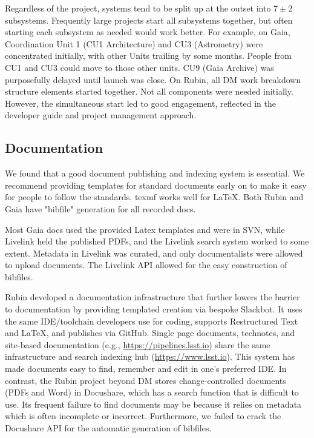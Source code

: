 \documentclass[11pt,twoside]{article}
\begin{document}
Regardless of the project, systems tend to be split up at the outset into  $7 \pm 2$ subsystems.
Frequently large projects start all subsystems together, but often starting each subsystem as needed would work better.
For example, on Gaia, Coordination Unit 1 (CU1 Architecture) and CU3 (Astrometry) were concentrated initially, with other Units trailing by some months.
People from CU1 and CU3 could move to those other units.
CU9 (Gaia Archive) was purposefully delayed until launch was close.
On Rubin, all DM work breakdown structure elements started together.
Not all components were needed initially.
However, the simultaneous start led to good engagement, reflected in the developer guide and project management approach.


\subsection{Documentation}
We found that a good document publishing and indexing system is essential.
We recommend providing templates for standard documents early on to make it easy for people to follow the standards. texmf works well for \LaTeX. Both Rubin and Gaia have "bibfile" generation for all recorded docs.

Most Gaia docs used the provided Latex templates and were in SVN, while Livelink held the published PDFs, and the Livelink search system worked to some extent.
Metadata in Livelink was curated, and only documentalists were allowed to upload documents.
The Livelink API allowed for the easy construction of bibfiles.

Rubin developed a documentation infrastructure that further lowers the barrier to documentation by providing templated creation via bespoke Slackbot. It uses the same IDE/toolchain developers use for coding, supports Restructured Text and \LaTeX, and publishes via GitHub.
Single page documents, technotes, and site-based documentation (e.g., \url{https://pipelines.lsst.io}) share the same infrastructure \citep{SQR-000} and search indexing hub (\url{https://www.lsst.io}).
This system has made documents easy to find, remember and edit in one's preferred IDE.
In contrast, the Rubin project beyond DM stores change-controlled documents (PDFs and Word) in Docushare, which has a search function that is difficult to use.
Its frequent failure to find documents may be because it relies on metadata which is often incomplete or incorrect.  Furthermore, we failed to crack the Docushare API for the automatic generation of bibfiles.
\end{document}
